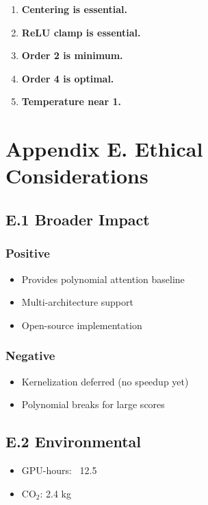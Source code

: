 \begin{enumerate}
\item \textbf{Centering is essential.}
\item \textbf{ReLU clamp is essential.}
\item \textbf{Order 2 is minimum.}
\item \textbf{Order 4 is optimal.}
\item \textbf{Temperature near 1.}

\end{enumerate}


\section{Appendix E. Ethical Considerations}

\subsection{E.1 Broader Impact}

\subsubsection{Positive}
\begin{itemize}
\item Provides polynomial attention baseline
\item Multi-architecture support
\item Open-source implementation

\end{itemize}
\subsubsection{Negative}
\begin{itemize}
\item Kernelization deferred (no speedup yet)
\item Polynomial breaks for large scores

\end{itemize}
\subsection{E.2 Environmental}

\begin{itemize}
\item GPU-hours: ~12.5
\item CO$_2$: 2.4 kg

\end{itemize}
